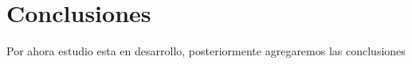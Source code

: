\hypertarget{Conclusiones}{%
    \section{Conclusiones}\label{Conclusiones}}
    Por ahora estudio esta en desarrollo, posteriormente agregaremos las conclusiones